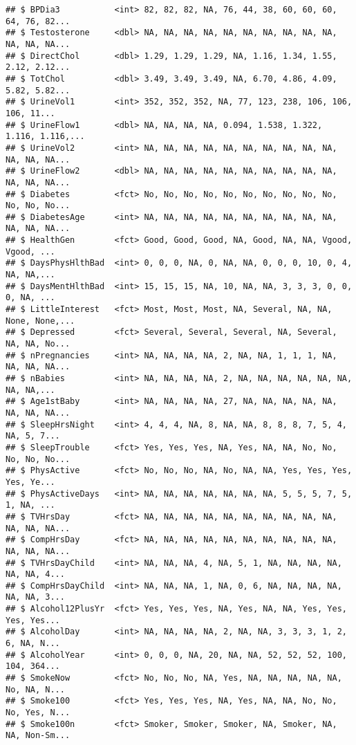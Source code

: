 \documentclass[
]{article}
\begin{document}
\begin{verbatim}
## $ BPDia3           <int> 82, 82, 82, NA, 76, 44, 38, 60, 60, 60, 64, 76, 82...
## $ Testosterone     <dbl> NA, NA, NA, NA, NA, NA, NA, NA, NA, NA, NA, NA, NA...
## $ DirectChol       <dbl> 1.29, 1.29, 1.29, NA, 1.16, 1.34, 1.55, 2.12, 2.12...
## $ TotChol          <dbl> 3.49, 3.49, 3.49, NA, 6.70, 4.86, 4.09, 5.82, 5.82...
## $ UrineVol1        <int> 352, 352, 352, NA, 77, 123, 238, 106, 106, 106, 11...
## $ UrineFlow1       <dbl> NA, NA, NA, NA, 0.094, 1.538, 1.322, 1.116, 1.116,...
## $ UrineVol2        <int> NA, NA, NA, NA, NA, NA, NA, NA, NA, NA, NA, NA, NA...
## $ UrineFlow2       <dbl> NA, NA, NA, NA, NA, NA, NA, NA, NA, NA, NA, NA, NA...
## $ Diabetes         <fct> No, No, No, No, No, No, No, No, No, No, No, No, No...
## $ DiabetesAge      <int> NA, NA, NA, NA, NA, NA, NA, NA, NA, NA, NA, NA, NA...
## $ HealthGen        <fct> Good, Good, Good, NA, Good, NA, NA, Vgood, Vgood, ...
## $ DaysPhysHlthBad  <int> 0, 0, 0, NA, 0, NA, NA, 0, 0, 0, 10, 0, 4, NA, NA,...
## $ DaysMentHlthBad  <int> 15, 15, 15, NA, 10, NA, NA, 3, 3, 3, 0, 0, 0, NA, ...
## $ LittleInterest   <fct> Most, Most, Most, NA, Several, NA, NA, None, None,...
## $ Depressed        <fct> Several, Several, Several, NA, Several, NA, NA, No...
## $ nPregnancies     <int> NA, NA, NA, NA, 2, NA, NA, 1, 1, 1, NA, NA, NA, NA...
## $ nBabies          <int> NA, NA, NA, NA, 2, NA, NA, NA, NA, NA, NA, NA, NA,...
## $ Age1stBaby       <int> NA, NA, NA, NA, 27, NA, NA, NA, NA, NA, NA, NA, NA...
## $ SleepHrsNight    <int> 4, 4, 4, NA, 8, NA, NA, 8, 8, 8, 7, 5, 4, NA, 5, 7...
## $ SleepTrouble     <fct> Yes, Yes, Yes, NA, Yes, NA, NA, No, No, No, No, No...
## $ PhysActive       <fct> No, No, No, NA, No, NA, NA, Yes, Yes, Yes, Yes, Ye...
## $ PhysActiveDays   <int> NA, NA, NA, NA, NA, NA, NA, 5, 5, 5, 7, 5, 1, NA, ...
## $ TVHrsDay         <fct> NA, NA, NA, NA, NA, NA, NA, NA, NA, NA, NA, NA, NA...
## $ CompHrsDay       <fct> NA, NA, NA, NA, NA, NA, NA, NA, NA, NA, NA, NA, NA...
## $ TVHrsDayChild    <int> NA, NA, NA, 4, NA, 5, 1, NA, NA, NA, NA, NA, NA, 4...
## $ CompHrsDayChild  <int> NA, NA, NA, 1, NA, 0, 6, NA, NA, NA, NA, NA, NA, 3...
## $ Alcohol12PlusYr  <fct> Yes, Yes, Yes, NA, Yes, NA, NA, Yes, Yes, Yes, Yes...
## $ AlcoholDay       <int> NA, NA, NA, NA, 2, NA, NA, 3, 3, 3, 1, 2, 6, NA, N...
## $ AlcoholYear      <int> 0, 0, 0, NA, 20, NA, NA, 52, 52, 52, 100, 104, 364...
## $ SmokeNow         <fct> No, No, No, NA, Yes, NA, NA, NA, NA, NA, No, NA, N...
## $ Smoke100         <fct> Yes, Yes, Yes, NA, Yes, NA, NA, No, No, No, Yes, N...
## $ Smoke100n        <fct> Smoker, Smoker, Smoker, NA, Smoker, NA, NA, Non-Sm...

\end{verbatim}
\end{document}
